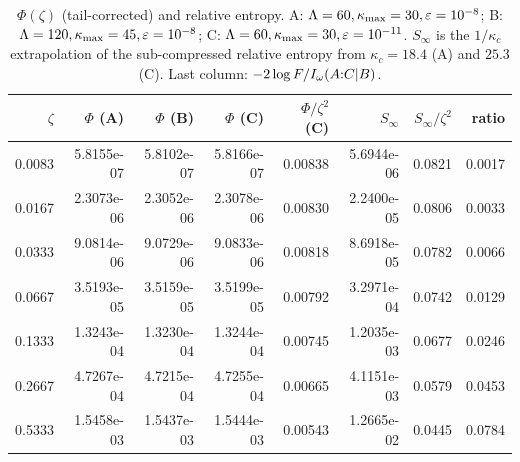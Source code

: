 \begin{table}[ht]\centering\small
\caption{\(\Phi(\zeta)\) (tail-corrected) and relative entropy. A: \(\Lambda=60,\kappa_{\max}=30,\varepsilon=10^{-8}\); B: \(\Lambda=120,\kappa_{\max}=45,\varepsilon=10^{-8}\); C: \(\Lambda=60,\kappa_{\max}=30,\varepsilon=10^{-11}\). \(S_\infty\) is the \(1/\kappa_c\) extrapolation of the sub-compressed relative entropy from \(\kappa_c=18.4\) (A) and \(25.3\) (C). Last column: \(-2\log F/I_\omega(A{:}C|B)\).}\label{tab:scan}
\begin{tabular}{r rrr r r r r}\toprule
\(\zeta\) & \(\Phi\) (A) & \(\Phi\) (B) & \(\Phi\) (C) & \(\Phi/\zeta^2\) (C) & \(S_\infty\) & \(S_\infty/\zeta^2\) & ratio \\\midrule
0.0083 & 5.8155e-07 & 5.8102e-07 & 5.8166e-07 & 0.00838 & 5.6944e-06 & 0.0821 & 0.0017 \\
0.0167 & 2.3073e-06 & 2.3052e-06 & 2.3078e-06 & 0.00830 & 2.2400e-05 & 0.0806 & 0.0033 \\
0.0333 & 9.0814e-06 & 9.0729e-06 & 9.0833e-06 & 0.00818 & 8.6918e-05 & 0.0782 & 0.0066 \\
0.0667 & 3.5193e-05 & 3.5159e-05 & 3.5199e-05 & 0.00792 & 3.2971e-04 & 0.0742 & 0.0129 \\
0.1333 & 1.3243e-04 & 1.3230e-04 & 1.3244e-04 & 0.00745 & 1.2035e-03 & 0.0677 & 0.0246 \\
0.2667 & 4.7267e-04 & 4.7215e-04 & 4.7255e-04 & 0.00665 & 4.1151e-03 & 0.0579 & 0.0453 \\
0.5333 & 1.5458e-03 & 1.5437e-03 & 1.5444e-03 & 0.00543 & 1.2665e-02 & 0.0445 & 0.0784 \\
\bottomrule\end{tabular}\end{table}
